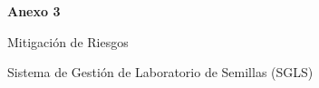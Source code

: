 \clearpage
\setcounter{subsection}{0}
\setcounter{subsubsection}{0}
\vspace*{3cm}
{\centering
{\Huge\bfseries Anexo 3\par}
\vspace{1cm}
{\LARGE Mitigación de Riesgos\par}
\vspace{2cm}
{\large Sistema de Gestión de Laboratorio de Semillas (SGLS)\par}
\vfill
\par}
\clearpage
